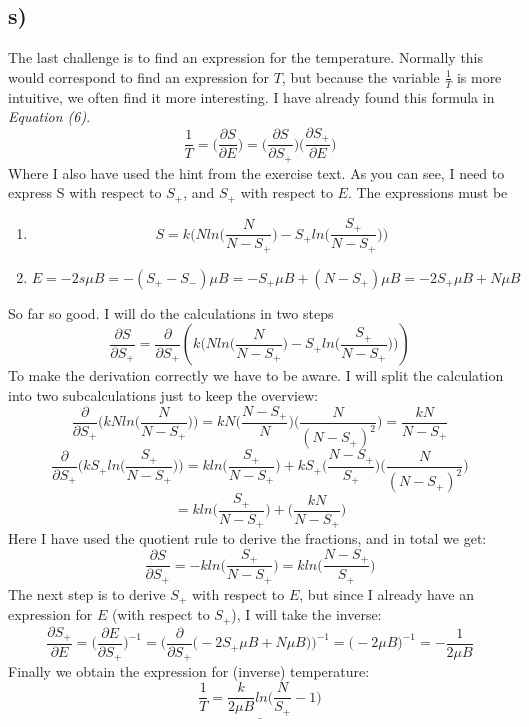 \documentclass{scrartcl}
\begin{document}
\subsection*{s)}
The last challenge is to find an expression for the temperature. Normally this would correspond to find an expression for $T$, but because the variable $\frac{1}{T}$ is more intuitive, we often find it more interesting. I have already found this formula in \textit{Equation (6)}.
$$\frac{1}{T}=\bigg(\frac{\partial S}{\partial E}\bigg)=\bigg(\frac{\partial S}{\partial S_+}\bigg)\bigg(\frac{\partial S_+}{\partial E}\bigg)$$
Where I also have used the hint from the exercise text. As you can see, I need to express S with respect to $S_+$, and $S_+$ with respect to $E$. The expressions must be
\begin{enumerate}
\item $$S=k\Bigg(Nln\bigg(\frac{N}{N-S_+}\bigg)-S_+ln\bigg(\frac{S_+}{N-S_+}\bigg)\Bigg)$$
\item $$E=-2s\mu B=-(S_+-S_-)\mu B=-S_+\mu B + (N-S_+)\mu B=-2S_+ \mu B +N\mu B$$
\end{enumerate}
So far so good. I will do the calculations in two steps
$$\frac{\partial S}{\partial S_+}=\frac{\partial}{\partial S_+}\left(k\Bigg(Nln\bigg(\frac{N}{N-S_+}\bigg)-S_+ln\bigg(\frac{S_+}{N-S_+}\bigg)\Bigg)\right)$$
To make the derivation correctly we have to be aware. I will split the calculation into two subcalculations just to keep the overview:
$$\frac{\partial}{\partial S_+}\Bigg(kNln\bigg(\frac{N}{N-S_+}\bigg)\Bigg)=kN\bigg(\frac{N-S_+}{N}\bigg)\bigg(\frac{N}{(N-S_+)^2}\bigg)=\frac{kN}{N-S_+}$$
$$\frac{\partial}{\partial S_+}\Bigg(kS_+ln\bigg(\frac{S_+}{N-S_+}\bigg)\Bigg)=kln\bigg(\frac{S_+}{N-S_+}\bigg)+kS_+\bigg(\frac{N-S_+}{S_+}\bigg)\bigg(\frac{N}{(N-S_+)^2}\bigg)$$
$$=kln\bigg(\frac{S_+}{N-S_+}\bigg)+\bigg(\frac{kN}{N-S_+}\bigg)$$
Here I have used the quotient rule to derive the fractions, and in total we get:
$$\frac{\partial S}{\partial S_+}=-kln\bigg(\frac{S_+}{N-S_+}\bigg)=kln\bigg(\frac{N-S_+}{S_+}\bigg)$$
The next step is to derive $S_+$ with respect to $E$, but since I already have an expression for $E$ (with respect to $S_+$), I will take the inverse:
$$\frac{\partial S_+}{\partial E}=\bigg(\frac{\partial E}{\partial S_+}\bigg)^{-1}=\bigg(\frac{\partial}{\partial S_+}\Big(-2S_+ \mu B +N\mu B\Big)\bigg)^{-1}=\bigg(-2\mu B\bigg)^{-1}=-\frac{1}{2\mu B}$$
Finally we obtain the expression for (inverse) temperature:
$$\underline{\frac{1}{T}=\frac{k}{2\mu B}ln\bigg(\frac{N}{S_+}-1\bigg)}$$
\newpage
\end{document}
